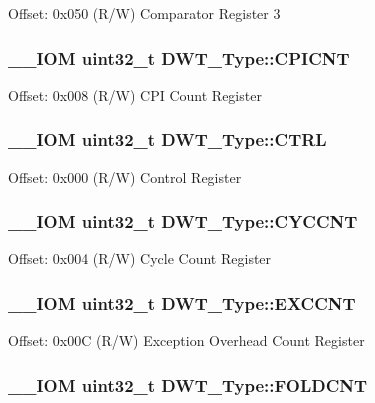 Offset\-: 0x050 (R/\-W) Comparator Register 3 \hypertarget{struct_d_w_t___type_a2c08096c82abe245c0fa97badc458154}{
\subsubsection[{C\-P\-I\-C\-N\-T}]{\setlength{\rightskip}{0pt plus 5cm}\-\_\-\-\_\-\-I\-O\-M uint32\-\_\-t D\-W\-T\-\_\-\-Type\-::\-C\-P\-I\-C\-N\-T}}\label{struct_d_w_t___type_a2c08096c82abe245c0fa97badc458154}
Offset\-: 0x008 (R/\-W) C\-P\-I Count Register \hypertarget{struct_d_w_t___type_add790c53410023b3b581919bb681fe2a}{
\subsubsection[{C\-T\-R\-L}]{\setlength{\rightskip}{0pt plus 5cm}\-\_\-\-\_\-\-I\-O\-M uint32\-\_\-t D\-W\-T\-\_\-\-Type\-::\-C\-T\-R\-L}}\label{struct_d_w_t___type_add790c53410023b3b581919bb681fe2a}
Offset\-: 0x000 (R/\-W) Control Register \hypertarget{struct_d_w_t___type_a102eaa529d9098242851cb57c52b42d9}{
\subsubsection[{C\-Y\-C\-C\-N\-T}]{\setlength{\rightskip}{0pt plus 5cm}\-\_\-\-\_\-\-I\-O\-M uint32\-\_\-t D\-W\-T\-\_\-\-Type\-::\-C\-Y\-C\-C\-N\-T}}\label{struct_d_w_t___type_a102eaa529d9098242851cb57c52b42d9}
Offset\-: 0x004 (R/\-W) Cycle Count Register \hypertarget{struct_d_w_t___type_a9fe20c16c5167ca61486caf6832686d1}{
\subsubsection[{E\-X\-C\-C\-N\-T}]{\setlength{\rightskip}{0pt plus 5cm}\-\_\-\-\_\-\-I\-O\-M uint32\-\_\-t D\-W\-T\-\_\-\-Type\-::\-E\-X\-C\-C\-N\-T}}\label{struct_d_w_t___type_a9fe20c16c5167ca61486caf6832686d1}
Offset\-: 0x00\-C (R/\-W) Exception Overhead Count Register \hypertarget{struct_d_w_t___type_a1cfc48384ebd8fd8fb7e5d955aae6c97}{
\subsubsection[{F\-O\-L\-D\-C\-N\-T}]{\setlength{\rightskip}{0pt plus 5cm}\-\_\-\-\_\-\-I\-O\-M uint32\-\_\-t D\-W\-T\-\_\-\-Type\-::\-F\-O\-L\-D\-C\-N\-T}}\label{struct_d_w_t___type_a1cfc48384ebd8fd8fb7e5d955aae6c97}
